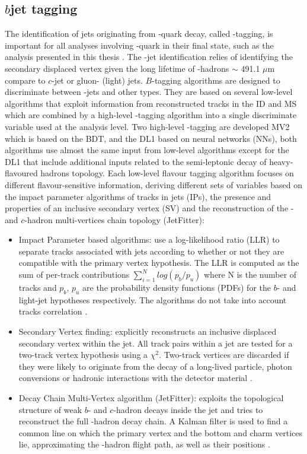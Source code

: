 \subsection{\texorpdfstring{$b$}-jet tagging}
\label{Jet:Tag:Dlr}
The identification of jets originating from \bq-quark decay, called \bq-tagging, is important for all analyses involving \bq-quark in their final state, such as the analysis presented in this thesis \HHyybb. The \bq-jet identification relies of identifying the secondary displaced vertex given the long lifetime of \bq-hadrons $\sim$ 491.1 $\mu$m compare to $c$-jet or gluon- (light) jets. $B$-tagging algorithms are designed to discriminate between \bq-jets and other types. They are based on several low-level algorithms that exploit information from reconstructed tracks in the ID and MS which are combined by a high-level \bq-tagging algorithm into a single discriminate variable used at the analysis level. Two high-level \bq-tagging are developed MV2 which is based on the BDT, and the DL1 based on neural networks (NNs), both algorithms use almost the same input from low-level algorithms except for the DL1 that include additional inputs related to the semi-leptonic decay of heavy-flavoured hadrons topology. Each low-level flavour tagging algorithm focuses on different flavour-sensitive information, deriving different sets of variables based on the impact parameter algorithms of tracks in jets (IPs), the presence and properties of an inclusive secondary vertex (SV) and the reconstruction of the \bq- and $c$-hadron multi-vertices chain topology (JetFitter):
\begin{itemize}
    \item Impact Parameter based algorithms: use a log-likelihood ratio (LLR) to separate tracks associated with jets according to whether or not they are compatible with the primary vertex hypothesis. The LLR is computed as the sum of per-track contributions $\sum_{i=1}^{N}log(p_b/p_u)$ where N is the number of tracks and $p_b$, $p_u$ are the probability density functions (PDFs) for the $b$- and light-jet hypotheses respectively. The algorithms do not take into account tracks correlation \cite{IP,IP2}. 
    \item Secondary Vertex finding: explicitly reconstructs an inclusive displaced secondary vertex within the jet. All track pairs within a jet are tested for a two-track vertex hypothesis using a $\chi^2$. Two-track vertices are discarded if they were likely to originate from the decay of a long-lived particle, photon conversions or hadronic interactions with the detector material \cite{SV}.
    \item Decay Chain Multi-Vertex algorithm (JetFitter): exploits the topological structure of weak $b$- and $c$-hadron decays inside the jet and tries to reconstruct the full \bq-hadron decay chain. A Kalman filter is used to find a common line on which the primary vertex and the bottom and charm vertices lie, approximating the \bq-hadron flight path, as well as their positions \cite{JetFitter}.
\end{itemize}
